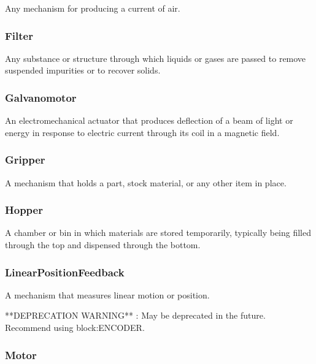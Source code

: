 Any mechanism for producing a current of air.

\FloatBarrier

\subsubsection{Filter}
  \label{sec:Filter}


Any substance or structure through which liquids or gases are passed to remove suspended impurities or to recover solids.

\FloatBarrier

\subsubsection{Galvanomotor}
  \label{sec:Galvanomotor}


An electromechanical actuator that produces deflection of a beam of light or energy in response to electric current through its coil in a magnetic field.

\FloatBarrier

\subsubsection{Gripper}
  \label{sec:Gripper}


A mechanism that holds a part, stock material, or any other item in place.

\FloatBarrier

\subsubsection{Hopper}
  \label{sec:Hopper}


A chamber or bin in which materials are stored temporarily, typically being filled through the top and dispensed through the bottom.

\FloatBarrier

\subsubsection{LinearPositionFeedback}
  \label{sec:LinearPositionFeedback}


A mechanism that measures linear motion or position.

**DEPRECATION WARNING** : May be deprecated in the future. Recommend using {block:ENCODER}.

\FloatBarrier

\subsubsection{Motor}
  \label{sec:Motor}


